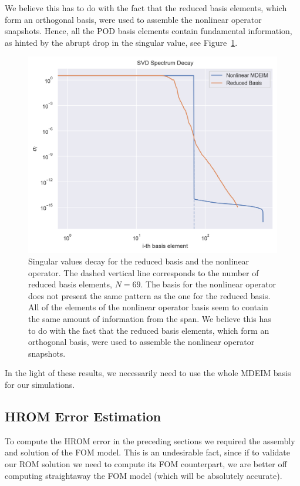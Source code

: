 \documentclass[../../thesis.tex]{subfiles}
\begin{document}
We believe this has to do with the fact that the reduced basis elements,
which form an orthogonal basis, were used to assemble the nonlinear operator snapshots.
Hence, all the POD basis elements contain fundamental information,
as hinted by the abrupt drop in the singular value, see Figure~\ref{fig:sigmas_decay}. 
\begin{figure}[h]
    \centering
    \includegraphics[width=1\columnwidth]{research_project/piston/figures/mdeim_certification/sigmas_problem.png}
    \caption{Singular values decay for the reduced basis and the nonlinear operator.
    The dashed vertical line corresponds to the number of reduced basis elements, $N=69$.
    The basis for the nonlinear operator does not present the same pattern as the 
    one for the reduced basis.
    All of the elements of the nonlinear operator basis 
    seem to contain the same amount of information from the span.
    We believe this has to do with the fact that the reduced basis elements,
    which form an orthogonal basis, were used to assemble the nonlinear operator snapshots.}
    \label{fig:sigmas_decay}
\end{figure}

In the light of these results, 
we necessarily need to use the whole MDEIM basis for our simulations.


\subsection{HROM Error Estimation}
\label{sec:hrom_results_posteriori_error_estimation}
To compute the HROM error in the preceding sections
we required the assembly and solution of the FOM model.
This is an undesirable fact, since if to validate our ROM solution
we need to compute its FOM counterpart, 
we are better off computing straightaway the FOM model 
(which will be absolutely accurate).
\end{document}
